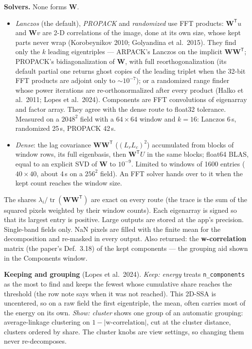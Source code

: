 \documentclass[10pt]{article}
\begin{document}
\textbf{Solvers.} None forms $\mathbf W$.
\begin{itemize}\itemsep2pt
  \item \emph{Lanczos} (the default), \emph{PROPACK} and \emph{randomized} use FFT products: $\mathbf
        W^{\mathsf T}u$ and $\mathbf Wv$ are 2-D correlations of the image, done at its own size,
        whose kept parts never wrap (Korobeynikov 2010; Golyandina et al.\ 2015). They find only
        the $k$ leading eigentriples --- ARPACK's Lanczos on the implicit $\mathbf W\mathbf
        W^{\mathsf T}$; PROPACK's bidiagonalization of $\mathbf W$, with full reorthogonalization
        (its default partial one returns ghost copies of the leading triplet when the 32-bit FFT
        products are adjoint only to $\sim10^{-7}$); or a randomized range finder whose power
        iterations are re-orthonormalized after every product (Halko et al.\ 2011; Lopes et al.\
        2024). Components are FFT convolutions of eigenarray and factor array. They agree with the
        dense route to float32 tolerance. Measured on a $2048^2$ field with a $64\times64$ window
        and $k=16$: Lanczos 6\,s, randomized 25\,s, PROPACK 42\,s.
  \item \emph{Dense}: the lag covariance $\mathbf W\mathbf W^{\mathsf T}$ ($(L_rL_c)^2$)
        accumulated from blocks of window rows, its full eigenbasis, then $\mathbf W^{\mathsf
        T}U$ in the same blocks; float64 BLAS, equal to an explicit SVD of $\mathbf W$ to
        $10^{-9}$. Limited to windows of 1600 entries ($40\times40$, about 4\,s on a $256^2$ field).
        An FFT solver hands over to it when the kept count reaches the window size.
\end{itemize}
The shares $\lambda_i/\operatorname{tr}(\mathbf W\mathbf W^{\mathsf T})$ are exact on every route
(the trace is the sum of the squared pixels weighted by their window counts). Each eigenarray is
signed so that its largest entry is positive. Large outputs are stored at the app's precision.
Single-band fields only. NaN pixels are filled with the finite mean for the decomposition and
re-masked in every output. Also returned: the \textbf{w-correlation} matrix (the paper's
Def.~3.18) of the kept components --- the grouping aid shown in the Components window.

\textbf{Keeping and grouping} (Lopes et al.\ 2024). \emph{Keep: energy} treats
\texttt{n\_components} as the most to find and keeps the fewest whose cumulative share reaches
the threshold (the row note says when it was not reached). This 2D-SSA is uncentered, so on a raw
field the first eigentriple, the mean, often carries most of the energy on its own.
\emph{Show: cluster} shows one group of an automatic grouping: average-linkage clustering on
$1-|\text{w-correlation}|$, cut at the cluster distance, clusters ordered by share. The cluster knobs
are view settings, so changing them never re-decomposes.
\end{document}

